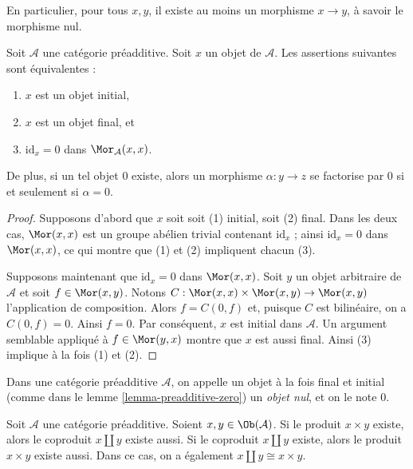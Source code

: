 \noindent
En particulier, pour tous $x, y$, il existe au moins
un morphisme $x \to y$, à savoir le morphisme nul.

\begin{lemma}
\label{lemma-preadditive-zero}
Soit $\mathcal{A}$ une catégorie préadditive.
Soit $x$ un objet de $\mathcal{A}$.
Les assertions suivantes sont équivalentes :
\begin{enumerate}
\item $x$ est un objet initial,
\item $x$ est un objet final, et
\item $\text{id}_x = 0$ dans $\Mor_\mathcal{A}(x, x)$.
\end{enumerate}
De plus, si un tel objet $0$ existe, alors un morphisme
$\alpha : y \to z$ se factorise par $0$ si et seulement si $\alpha = 0$.
\end{lemma}

\begin{proof}
Supposons d'abord que $x$ soit soit (1) initial, soit (2) final.
Dans les deux cas, $\Mor(x,x)$ est un groupe abélien trivial
contenant $\text{id}_x$ ; ainsi $\text{id}_x = 0$ dans
$\Mor(x, x)$, ce qui montre que (1) et (2) impliquent chacun (3).

\medskip\noindent
Supposons maintenant que $\text{id}_x = 0$ dans $\Mor(x,x)$. Soit $y$
un objet arbitraire de $\mathcal{A}$ et soit $f \in \Mor(x ,y)$.
Notons $C : \Mor(x,x) \times \Mor(x,y) \to \Mor(x,y)$ l'application de composition.
Alors $f = C(0, f)$ et, puisque $C$ est bilinéaire, on a $C(0, f) = 0$.
Ainsi $f = 0$. Par conséquent, $x$ est initial dans $\mathcal{A}$.
Un argument semblable appliqué à $f \in \Mor(y, x)$ montre que
$x$ est aussi final. Ainsi (3) implique à la fois (1) et (2).
\end{proof}

\begin{definition}
\label{definition-zero-object}
Dans une catégorie préadditive $\mathcal{A}$, on appelle un objet à la fois
final et initial (comme dans le lemme \ref{lemma-preadditive-zero}) un
{\it objet nul}, et on le note $0$.
\end{definition}

\begin{lemma}
\label{lemma-preadditive-direct-sum}
Soit $\mathcal{A}$ une catégorie préadditive.
Soient $x, y \in \Ob(\mathcal{A})$.
Si le produit $x \times y$ existe, alors le
coproduit $x \amalg y$ existe aussi.
Si le coproduit $x \amalg y$ existe, alors le
produit $x \times y$ existe aussi. Dans ce cas,
on a également $x \amalg y \cong x \times y$.
\end{lemma}

